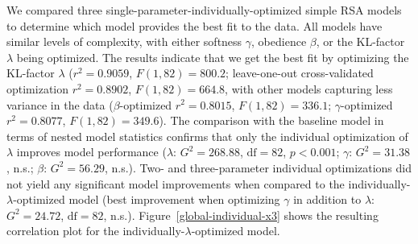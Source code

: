 \documentclass[11pt,a4paper]{article}
\begin{document}



We compared three single-parameter-individually-optimized simple RSA models to determine which model provides the best fit to the data. 
All models have similar levels of complexity, with either softness $\gamma$, obedience $\beta$, or the KL-factor $\lambda$ being optimized.
The results indicate that we get the best fit by optimizing the KL-factor $\lambda$ ($r^{2}=0.9059$, $F(1,82) = 800.2$; leave-one-out cross-validated optimization $r^{2}=0.8902$, $F(1,82) = 664.8$, with other models capturing less variance in the data ($\beta$-optimized $r^{2}=0.8015$, $F(1,82) = 336.1$; $\gamma$-optimized $r^{2}=0.8077$, $F(1,82) = 349.6$).
The comparison with the baseline model in terms of nested model statistics confirms that only the individual optimization of $\lambda$ improves model performance ($\lambda$: $G^2=268.88$, $\textrm{df}=82$, $p<0.001$; $\gamma$: $G^2=31.38$, n.s.; $\beta$: $G^2=56.29$, n.s.).
Two- and three-parameter individual optimizations did not yield any significant model improvements when compared to the individually-$\lambda$-optimized model (best improvement when optimizing $\gamma$ in addition to $\lambda$: $G^2=24.72$, $\textrm{df}=82$, n.s.).
Figure~\ref{global-individual-x3} shows the resulting correlation plot for the individually-$\lambda$-optimized model. 
 
\end{document}
